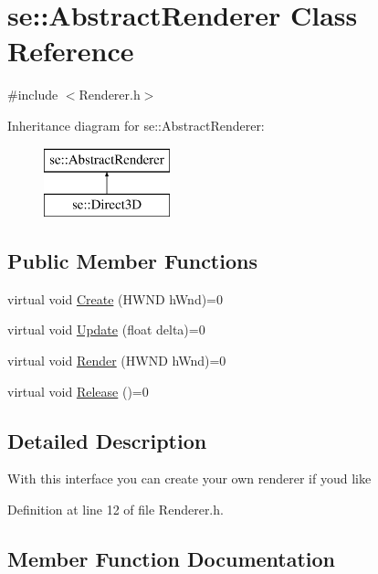 \hypertarget{classse_1_1_abstract_renderer}{}\section{se\+:\+:Abstract\+Renderer Class Reference}
\label{classse_1_1_abstract_renderer}


{\ttfamily \#include $<$Renderer.\+h$>$}

Inheritance diagram for se\+:\+:Abstract\+Renderer\+:\begin{figure}[H]
\begin{center}
\leavevmode
\includegraphics[height=2.000000cm]{classse_1_1_abstract_renderer}
\end{center}
\end{figure}
\subsection*{Public Member Functions}
\begin{DoxyCompactItemize}
\item 
virtual void \mbox{\hyperlink{classse_1_1_abstract_renderer_afdfce8b91028448c17ce27550827f192}{Create}} (H\+W\+ND h\+Wnd)=0
\item 
virtual void \mbox{\hyperlink{classse_1_1_abstract_renderer_aae49e7417663d6a5aca34a2bb37b4b28}{Update}} (float delta)=0
\item 
virtual void \mbox{\hyperlink{classse_1_1_abstract_renderer_acdc5f90b702a6c85c53d9b93334ae230}{Render}} (H\+W\+ND h\+Wnd)=0
\item 
virtual void \mbox{\hyperlink{classse_1_1_abstract_renderer_a98e35b7db62827580573185ed91b25bb}{Release}} ()=0
\end{DoxyCompactItemize}


\subsection{Detailed Description}
With this interface you can create your own renderer if you\textquotesingle{}d like 

Definition at line 12 of file Renderer.\+h.



\subsection{Member Function Documentation}
\mbox{\label{classse_1_1_abstract_renderer_afdfce8b91028448c17ce27550827f192}} 
